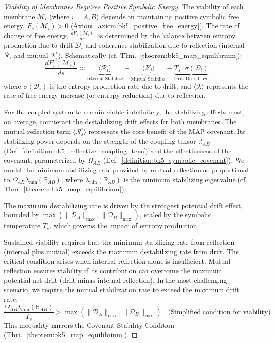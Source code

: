 \begin{proof}[Viability of Membranes Requires Positive Symbolic Energy]
\label{proof:bk5_membrane_viability_positive_energy}
The viability of each membrane \( \mathscr{M}_i \) (where \( i = A, B \)) depends on maintaining positive symbolic free energy, \( F_s(\mathscr{M}_i) > 0 \) (Axiom~\ref{axiom:bk5_positive_free_energy}). The rate of change of free energy, \( \frac{dF_s(\mathscr{M}_i)}{ds} \), is determined by the balance between entropy production due to drift \( \mathcal{D}_i \) and coherence stabilization due to reflection (internal \( \mathcal{R}_i \) and mutual \( \mathcal{R}_j^i \)). Schematically (cf. Thm.~\ref{theorem:bk5_map_equilibrium}):
\begin{equation}
\frac{dF_s(\mathscr{M}_i)}{ds} \approx \underbrace{\langle \mathcal{R}_i \rangle}_{\text{Internal Stabilize}} + \underbrace{\langle \mathcal{R}_j^i \rangle}_{\text{Mutual Stabilize}} - \underbrace{T_s \cdot \sigma(\mathcal{D}_i)}_{\text{Drift Destabilize}}
\end{equation}
where \( \sigma(\mathcal{D}_i) \) is the entropy production rate due to drift, and \( \langle \mathcal{R} \rangle \) represents the rate of free energy increase (or entropy reduction) due to reflection.

For the coupled system to remain viable indefinitely, the stabilizing effects must, on average, counteract the destabilizing drift effects for both membranes. The mutual reflection term \( \langle \mathcal{R}_j^i \rangle \) represents the core benefit of the MAP covenant. Its stabilizing power depends on the strength of the coupling tensor \( \mathbb{R}_{AB} \) (Def.~\ref{definition:bk5_reflective_coupling_tens}) and the effectiveness of the covenant, parameterized by \( \Omega_{AB} \) (Def.~\ref{definition:bk5_symbolic_covenant}). We model the minimum stabilizing rate provided by mutual reflection as proportional to \( \Omega_{AB} \lambda_{\min}(\mathbb{R}_{AB}) \), where \( \lambda_{\min}(\mathbb{R}_{AB}) \) is the minimum stabilizing eigenvalue (cf. Thm.~\ref{theorem:bk5_map_equilibrium}).

The maximum destabilizing rate is driven by the strongest potential drift effect, bounded by \( \max(\| \mathcal{D}_A \|_{\max}, \| \mathcal{D}_B \|_{\max}) \), scaled by the symbolic temperature \( T_s \), which governs the impact of entropy production.

Sustained viability requires that the minimum stabilizing rate from reflection (internal plus mutual) exceeds the maximum destabilizing rate from drift. The critical condition arises when internal reflection alone is insufficient. Mutual reflection ensures viability if its contribution can overcome the maximum potential net drift (drift minus internal reflection). In the most challenging scenario, we require the mutual stabilization rate to exceed the maximum drift rate:
\begin{equation}
\frac{\Omega_{AB} \lambda_{\min}(\mathbb{R}_{AB})}{T_s} > \max(\| \mathcal{D}_A \|_{\max}, \| \mathcal{D}_B \|_{\max}) \quad \text{(Simplified condition for viability)}
\end{equation}
This inequality mirrors the Covenant Stability Condition (Thm.~\ref{theorem:bk5_map_equilibrium}).


\end{proof}
